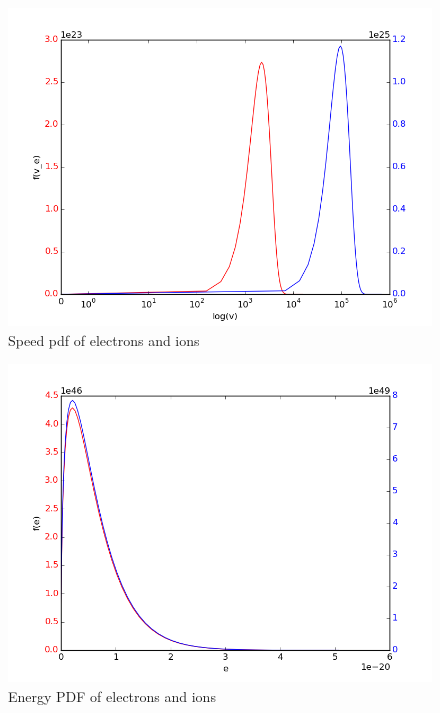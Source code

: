 \documentclass[11pt, a4paper]{article}
\begin{document}
\begin{figure}[H]
 \centering
 \includegraphics[width = \textwidth]{Plasma_speed.png}
 \caption{Speed pdf of electrons and ions}
 \label{fig:plasma_s}
\end{figure}


\begin{figure}[H]
 \centering
 \includegraphics[width = \textwidth]{Plasma_energy.png}
 \caption{Energy PDF of electrons and ions}
 \label{fig:plasma_e}
\end{figure}
\end{document}
